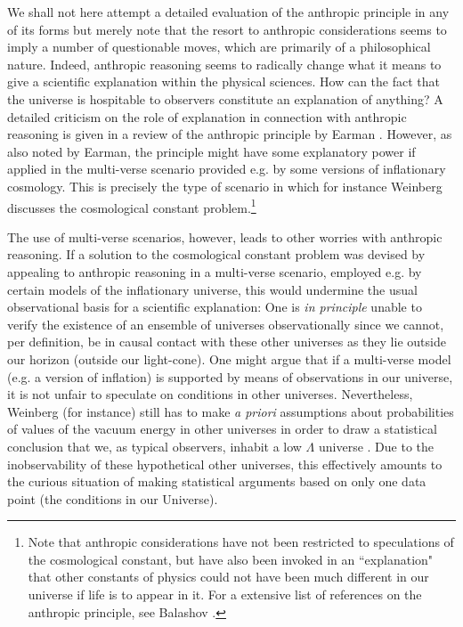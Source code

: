 \documentclass[12pt]{article}
\begin{document}
We shall not here attempt a detailed evaluation of the anthropic
principle in any of its forms but merely note that the resort to
anthropic considerations seems to imply a number of questionable
moves, which are primarily of a philosophical nature. Indeed,
anthropic reasoning seems to radically change what it means to
give a scientific explanation within the physical sciences. How
can the fact that the universe is hospitable to observers
constitute an explanation of anything? A detailed criticism on the
role of explanation in connection with anthropic reasoning is
given in a review of the anthropic principle by Earman
\cite{earman87}. However, as also noted by Earman, the principle
might have some explanatory power if applied in the multi-verse
scenario provided e.g. by some versions of inflationary cosmology.
This is precisely the type of scenario in which for instance
Weinberg discusses the cosmological constant
problem.\footnote{Note that anthropic considerations have not been
restricted to speculations of the cosmological constant, but have
also been invoked in an ``explanation" that other constants of
physics could not have been much different in our universe if life
is to appear in it. For a extensive list of references on the
anthropic principle, see Balashov \cite{balashov91}.} 

The use of multi-verse scenarios, however, leads to other worries
with anthropic reasoning. If a solution to the cosmological
constant problem was devised by appealing to anthropic reasoning
in a multi-verse scenario, employed e.g. by certain models of the
inflationary universe, this would undermine the usual
observational basis for a scientific explanation: One is {\em in
principle} unable to verify the existence of an ensemble of
universes observationally since we cannot, per definition, be in
causal contact with these other universes as they lie outside our
horizon (outside our light-cone). One might argue that if a
multi-verse model (e.g. a version of inflation) is supported by
means of observations in our universe, it is not unfair to
speculate on conditions in other universes. Nevertheless, Weinberg
(for instance) still has to make {\em a priori} assumptions about
probabilities of values of the vacuum energy in other universes in
order to draw a statistical conclusion that we, as typical
observers, inhabit a low $\Lambda$ universe \cite{weinberg96b}.
Due to the inobservability of these hypothetical other universes,
this effectively amounts to the curious situation of making
statistical arguments based on only one data point (the conditions
in our Universe). 
\end{document}
